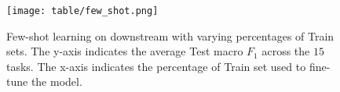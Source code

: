 \begin{figure}[!ht]
\centering
\texttt{[image: table/few\_shot.png]} 
\caption{Few-shot learning on downstream with varying percentages of Train sets. The y-axis indicates the average Test macro $F_1$ across the $15$ tasks. The x-axis indicates the percentage of Train set used to fine-tune the model.}\label{fig:data_percent}
\end{figure} 
